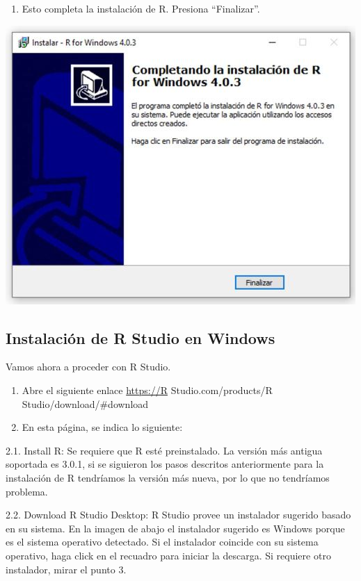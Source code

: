 \documentclass[
]{book}
\providecommand{\tightlist}{%
  \setlength{\itemsep}{0pt}\setlength{\parskip}{0pt}}
\begin{document}
\begin{enumerate}
\def\labelenumi{\arabic{enumi}.}
\setcounter{enumi}{14}
\tightlist
\item
  Esto completa la instalación de R. Presiona ``Finalizar''.
\end{enumerate}

\includegraphics{data/15.jpg}

\hypertarget{instalaciuxf3n-de-r-studio-en-windows}{%
\subsection{Instalación de R Studio en Windows}\label{instalaciuxf3n-de-r-studio-en-windows}}

Vamos ahora a proceder con R Studio.

\begin{enumerate}
\def\labelenumi{\arabic{enumi}.}
\item
  Abre el siguiente enlace \url{https://R} Studio.com/products/R Studio/download/\#download
\item
  En esta página, se indica lo siguiente:
\end{enumerate}

2.1. Install R: Se requiere que R esté preinstalado. La versión más antigua soportada es 3.0.1, si se siguieron los pasos descritos anteriormente para la instalación de R tendríamos la versión más nueva, por lo que no tendríamos problema.

2.2. Download R Studio Desktop: R Studio provee un instalador sugerido basado en su sistema. En la imagen de abajo el instalador sugerido es Windows porque es el sistema operativo detectado. Si el instalador coincide con su sistema operativo, haga click en el recuadro para iniciar la descarga. Si requiere otro instalador, mirar el punto 3.
\end{document}
